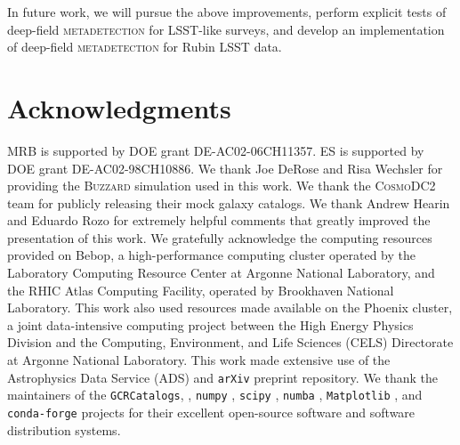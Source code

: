 \documentclass[twocolumn]{openjournal}
\makeatletter
\newcommand{\mdet}{\textsc{metadetection}\@\xspace}
\newcommand{\cosmodctwo}{\textsc{CosmoDC2}\@\xspace}
\newcommand{\buzzard}{\textsc{Buzzard}\@\xspace}
\makeatother
\begin{document}
In future work, we will pursue the above improvements, perform explicit tests
of deep-field \mdet for LSST-like surveys, and develop an implementation of
deep-field \mdet for Rubin LSST data.

\section*{Acknowledgments}

MRB is supported by DOE grant DE-AC02-06CH11357.  ES is supported by DOE grant DE-AC02-98CH10886.
We thank Joe DeRose and Risa Wechsler for providing the \buzzard simulation used in this work.
We thank the \cosmodctwo team
for publicly releasing their mock galaxy catalogs. We thank Andrew Hearin and Eduardo
Rozo for extremely helpful comments that greatly improved the presentation of this work.
We gratefully acknowledge the computing resources provided on Bebop, a high-performance
computing cluster operated by the Laboratory Computing Resource Center at Argonne
National Laboratory, and the RHIC Atlas Computing Facility, operated by Brookhaven
National Laboratory. This work also used resources made available on the Phoenix
cluster, a joint data-intensive computing project between the High Energy Physics
Division and the Computing, Environment, and Life Sciences (CELS) Directorate at Argonne
National Laboratory. This work made extensive use of the Astrophysics Data Service (ADS)
and \texttt{arXiv} preprint repository. We thank the maintainers of the
\texttt{GCRCatalogs}, \citep{gcrcatalogs}, \texttt{numpy} \citep{numpy}, \texttt{scipy}
\citep{scipy}, \texttt{numba} \citep{numba}, \texttt{Matplotlib} \citep{matplotlib}, and
\texttt{conda-forge} \citep{condaforge} projects for their excellent open-source
software and software distribution systems.




\end{document}
